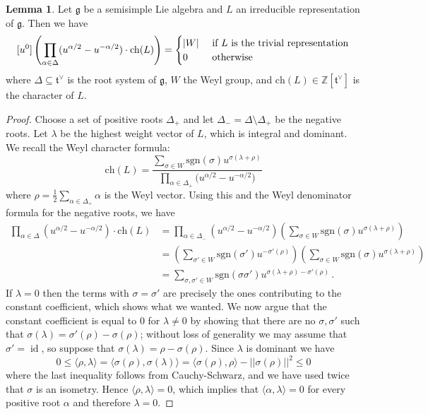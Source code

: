 \documentclass[12pt]{amsart}
\theoremstyle{definition}
\newtheorem{lemma}[definition]{Lemma}
\newcommand{\BZ}{{\mathbb{Z}}}
\newcommand{\1}{\mathbf 1}
\newcommand{\Fg}{{\mathfrak{g}}}
\newcommand{\Ft}{{\mathfrak{t}}}
\DeclareMathOperator{\id}{id}
\newcommand{\sgn}{\mathrm{sgn}}
\newcommand{\ch}{\mathrm{ch}}
\begin{document}
\begin{lemma}\label{lem: weylcharacter}
Let $\Fg$ be a semisimple Lie algebra and $L$ an irreducible representation of $\Fg$. Then we have
\[[u^0]\left(\prod_{\alpha\in \Delta}(u^{\alpha/2}-u^{-\alpha/2})\cdot \ch(L)\right)=\begin{cases}
    |W|&\textup{ if }L\textup{ is the trivial representation}\\
    0& \textup{ otherwise}
\end{cases}\]
where $\Delta\subseteq \Ft^\vee$ is the root system of $\Fg$, $W$ the Weyl group, and $\ch(L)\in \BZ[\Ft^\vee]$ is the character of $L$.
\end{lemma}
\begin{proof}
    Choose a set of positive roots $\Delta_+$ and let $\Delta_-=\Delta\setminus \Delta_+$ be the negative roots. Let $\lambda$ be the highest weight vector of $L$, which is integral and dominant. We recall the Weyl character formula:
    \[\ch(L)=\frac{\sum_{\sigma\in W}\sgn(\sigma)u^{\sigma(\lambda+\rho)}}{\prod_{\alpha\in \Delta_+}\big(u^{\alpha/2}-u^{-\alpha/2}\big)}\]
    where $\rho=\frac{1}{2}\sum_{\alpha\in \Delta_+}\alpha$ is the Weyl vector. Using this and the Weyl denominator formula for the negative roots, we have
   \begin{align*} \prod_{\alpha\in \Delta}(u^{\alpha/2}-u^{-\alpha/2})\cdot \ch(L)&=\prod_{\alpha\in \Delta_-}(u^{\alpha/2}-u^{-\alpha/2})\left(\sum_{\sigma\in W}\sgn(\sigma)u^{\sigma(\lambda+\rho)}\right)\\
   &=\left(\sum_{\sigma'\in W}\sgn(\sigma')u^{-\sigma'(\rho)}\right)\left(\sum_{\sigma\in W}\sgn(\sigma)u^{\sigma(\lambda+\rho)}\right)\\
   &=\sum_{\sigma, \sigma'\in W}\sgn(\sigma\sigma') u^{\sigma(\lambda+\rho)-\sigma'(\rho)}\,.
   \end{align*}
   If $\lambda=0$ then the terms with $\sigma=\sigma'$ are precisely the ones contributing to the constant coefficient, which shows what we wanted. We now argue that the constant coefficient is equal to 0 for $\lambda\neq 0$ by showing that there are no $\sigma, \sigma'$ such that $\sigma(\lambda)=\sigma'(\rho)-\sigma(\rho)$; without loss of generality we may assume that $\sigma'=\id$, so suppose that $\sigma(\lambda)=\rho-\sigma(\rho)$. Since $\lambda$ is dominant we have
   \[0\leq \langle \rho, \lambda\rangle=\langle \sigma(\rho), \sigma(\lambda)\rangle=\langle \sigma(\rho),\rho\rangle-\lvert\lvert\sigma(\rho)\rvert\rvert^2\leq 0\]
   where the last inequality follows from Cauchy-Schwarz, and we have used twice that $\sigma$ is an isometry. Hence $\langle \rho, \lambda\rangle =0$, which implies that $\langle \alpha, \lambda\rangle=0$ for every positive root $\alpha$ and therefore $\lambda=0$.\qedhere
\end{proof}
\end{document}
